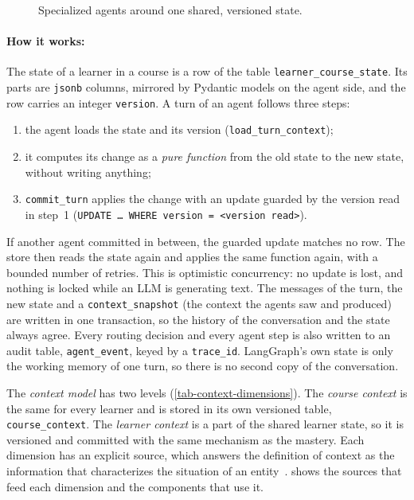 \begin{figure}[htbp]
  \centering
  \caption{Specialized agents around one shared, versioned state.}
  \label{fig-multi-agent}
\end{figure}

\paragraph{How it works:} The state of a learner in a course is a row of
the table \texttt{learner\_course\_state}. Its parts are \texttt{jsonb}
columns, mirrored by Pydantic models on the agent side, and the row
carries an integer \texttt{version}. A turn of an agent follows three
steps:
\begin{enumerate}
  \item the agent loads the state and its version
        (\texttt{load\_turn\_context});
  \item it computes its change as a \emph{pure function} from the old
        state to the new state, without writing anything;
  \item \texttt{commit\_turn} applies the change with an update guarded
        by the version read in step~1
        (\texttt{UPDATE \dots{} WHERE version = <version read>}).
\end{enumerate}
If another agent committed in between, the guarded update matches no row.
The store then reads the state again and applies the same function again,
with a bounded number of retries. This is optimistic concurrency: no
update is lost, and nothing is locked while an LLM is generating text. The
messages of the turn, the new state and a \texttt{context\_snapshot} (the
context the agents saw and produced) are written in one transaction, so
the history of the conversation and the state always agree. Every routing
decision and every agent step is also written to an audit table,
\texttt{agent\_event}, keyed by a \texttt{trace\_id}. LangGraph's own state
is only the working memory of one turn, so there is no second copy of the
conversation.

The \emph{context model} has two levels (\cref{tab-context-dimensions}).
The \emph{course context} is the same for every learner and is stored in
its own versioned table, \texttt{course\_context}. The \emph{learner
context} is a part of the shared learner state, so it is versioned and
committed with the same mechanism as the mastery. Each dimension has an
explicit source, which answers the definition of context as the
information that characterizes the situation of an
entity~\cite{dey2001context}.  shows the sources
that feed each dimension and the components that use it.

